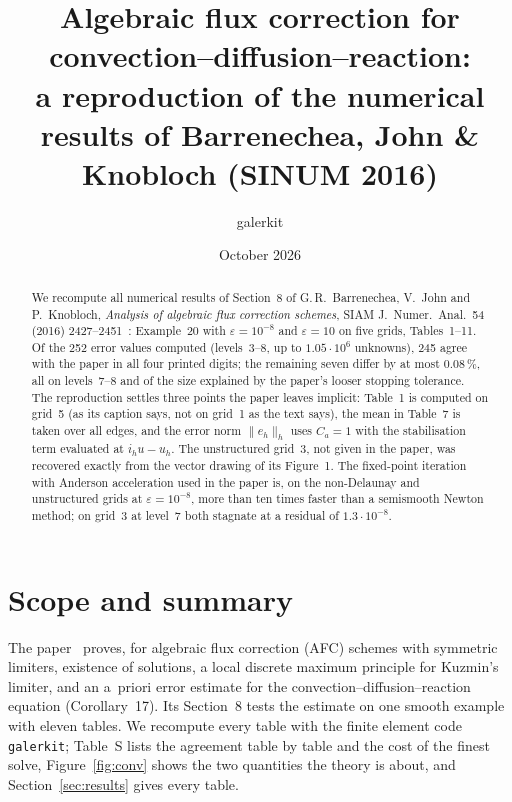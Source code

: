 \documentclass[11pt]{article}
\title{Algebraic flux correction for convection--diffusion--reaction:\\
a reproduction of the numerical results of Barrenechea, John \& Knobloch (SINUM 2016)}
\author{galerkit}
\date{October 2026}
\newcommand{\eps}{\varepsilon}
\begin{document}
\maketitle

\begin{abstract}
We recompute all numerical results of Section~8 of G.\,R.~Barrenechea, V.~John and P.~Knobloch, \emph{Analysis of
algebraic flux correction schemes}, SIAM J.\ Numer.\ Anal.\ 54 (2016) 2427--2451~\cite{BJK16}: Example~20 with
$\eps=10^{-8}$ and $\eps=10$ on five grids, Tables~1--11. Of the 252 error values computed (levels~3--8,
up to $1.05\cdot10^{6}$ unknowns), 245 agree with the paper in all four printed digits; the remaining seven differ by
at most $0.08\,\%$, all on levels~7--8 and of the size explained by the paper's looser stopping tolerance. The
reproduction settles three points the paper leaves implicit: Table~1 is computed on grid~5 (as its caption says,
not on grid~1 as the text says), the mean in Table~7 is taken over all edges, and the error norm $\|e_h\|_h$ uses
$C_a=1$ with the stabilisation term evaluated at $i_hu-u_h$. The unstructured grid~3, not given in the paper, was
recovered exactly from the vector drawing of its Figure~1. The fixed-point iteration with Anderson acceleration used
in the paper is, on the non-Delaunay and unstructured grids at $\eps=10^{-8}$, more than ten times faster than a
semismooth Newton method; on grid~3 at level~7 both stagnate at a residual of $1.3\cdot10^{-8}$.
\end{abstract}

\tableofcontents

\section{Scope and summary}

The paper~\cite{BJK16} proves, for algebraic flux correction (AFC) schemes with symmetric limiters, existence of
solutions, a local discrete maximum principle for Kuzmin's limiter, and an a~priori error estimate for the
convection--diffusion--reaction equation (Corollary~17). Its Section~8 tests the estimate on one smooth example with
eleven tables. We recompute every table with the finite element code \texttt{galerkit}; Table~S
lists the agreement table by table and the cost of the finest solve, Figure~\ref{fig:conv} shows the two quantities
the theory is about, and Section~\ref{sec:results} gives every table.
\end{document}
